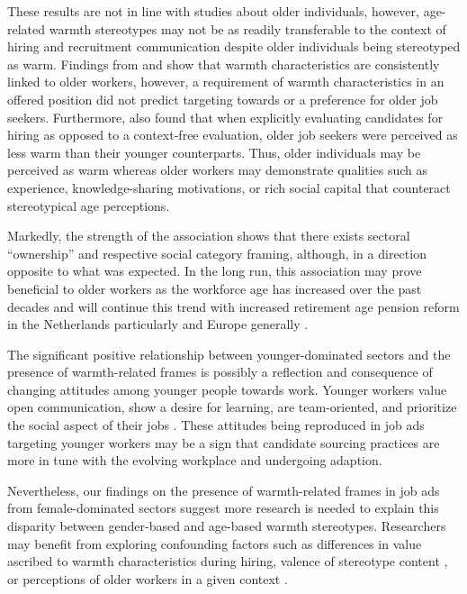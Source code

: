 \documentclass[man]{apa7}
\begin{document}
These results are not in line with studies about older individuals, however, age-related warmth stereotypes may not be as readily transferable to the context of hiring and recruitment communication despite older individuals being stereotyped as warm. Findings from \Textcite{abrams_old_2016} and \Textcite{krings_stereotypical_2011} show that warmth characteristics are consistently linked to older workers, however, a requirement of warmth characteristics in an offered position did not predict targeting towards or a preference for older job seekers. Furthermore, \Textcite{krings_stereotypical_2011} also found that when explicitly evaluating candidates for hiring as opposed to a context-free evaluation, older job seekers were perceived as less warm than their younger counterparts. Thus, older individuals may be perceived as warm whereas older workers may demonstrate qualities such as experience, knowledge-sharing motivations, or rich social capital that counteract stereotypical age perceptions.

Markedly, the strength of the association shows that there exists sectoral “ownership” and respective social category framing, although, in a direction opposite to what was expected. In the long run, this association may prove beneficial to older workers as the workforce age has increased over the past decades \parencite{oude_mulders_how_2020-1} and will continue this trend with increased retirement age pension reform in the Netherlands particularly \parencite{pilipiec_analysis_2022} and Europe generally \parencite{axelrad_actual_2022}.

The significant positive relationship between younger-dominated sectors and the presence of warmth-related frames is possibly a reflection and consequence of changing attitudes among younger people towards work. Younger workers value open communication, show a desire for learning, are team-oriented, and prioritize the social aspect of their jobs \parencite{baker_rosa_managing_2018, myers_millennials_2010}. These attitudes being reproduced in job ads targeting younger workers may be a sign that candidate sourcing practices are more in tune with the evolving workplace and undergoing adaption.

Nevertheless, our findings on the presence of warmth-related frames in job ads from female-dominated sectors suggest more research is needed to explain this disparity between gender-based and age-based warmth stereotypes. Researchers may benefit from exploring confounding factors such as differences in value ascribed to warmth characteristics during hiring, valence of stereotype content \parencite{suitner_role_2008}, or perceptions of older workers in a given context \parencite{hennekam_employability_2015}.
\end{document}
